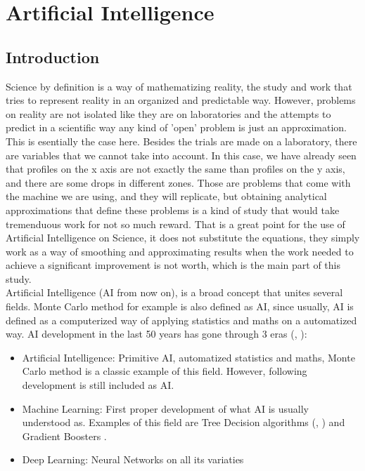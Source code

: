 \documentclass[openany]{article}
\begin{document}
\newpage 


\section{Artificial Intelligence}

\subsection{Introduction}

Science by definition is a way of mathematizing reality, the study and work that tries to represent reality in an organized and predictable way. However, problems on reality are not isolated like they are on laboratories and the attempts to predict in a scientific way any kind of 'open' problem is just an approximation. This is esentially the case here. Besides the trials are made on a laboratory, there are variables that we cannot take into account. In this case, we have already seen that profiles on the x axis are not exactly the same than profiles on the y axis, and there are some drops in different zones. Those are problems that come with the machine we are using, and they will replicate, but obtaining analytical approximations that define these problems is a kind of study that would take tremenduous work for not so much reward. That is a great point for the use of Artificial Intelligence on Science, it does not substitute the equations, they simply work as a way of smoothing and approximating results when the work needed to achieve a significant improvement is not worth, which is the main part of this study.\\

Artificial Intelligence (AI from now on), is a broad concept that unites several fields. Monte Carlo method for example is also defined as AI, since usually, AI is defined as a computerized way of applying statistics and maths on a automatized way. AI development in the last 50 years has gone through 3 eras (\cite{8259629}, \cite{BINI20182358}):

\begin{itemize}
	\item Artificial Intelligence: Primitive AI, automatized statistics and maths, Monte Carlo method is a classic example of this field. However, following development is still included as AI.
	\item Machine Learning: First proper development of what AI is usually understood as. Examples of this field are Tree Decision algorithms (\cite{palmer1979number}, \cite{batra1975classification}) and Gradient Boosters \cite{FREUND1997119}.
	\item Deep Learning: Neural Networks on all its variaties
\end{itemize}
\end{document}
